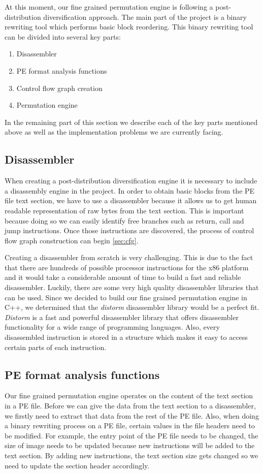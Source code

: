 \documentclass[11pt,final,conference,a4paper]{IEEEtran}
\begin{document}
At this moment, our fine grained permutation engine is following a post-distribution diversification approach. The main part of the project is a binary rewriting tool which performs basic block reordering. This binary rewriting tool can be divided into several key parts:
\begin{enumerate}
\item Disassembler
\item PE format analysis functions
\item Control flow graph creation
\item Permutation engine
\end{enumerate}
In the remaining part of this section we describe each of the key parts mentioned above as well as the implementation problems we are currently facing.

\subsection{Disassembler}
\label{sec:disassembler}
When creating a post-distribution diversification engine it is necessary to include a disassembly engine in the project. In order to obtain basic blocks from the PE file text section, we have to use a disassembler because it allows us to get human readable representation of raw bytes from the text section. This is important because doing so we can easily identify free branches such as return, call and jump instructions. Once those instructions are discovered, the process of control flow graph construction can begin \ref{sec:cfg}.

Creating a disassembler from scratch is very challenging. This is due to the fact that there are hundreds of possible processor instructions for the x86 platform and it would take a considerable amount of time to build a fast and reliable disassembler. Luckily, there are some very high quality disassembler libraries that can be used. Since we decided to build our fine grained permutation engine in C++, we determined that the \emph{distorm} disassembler library would be a perfect fit. \emph{Distorm} is a fast and powerful disassembler library that offers disassembler functionality for a wide range of programming languages. Also, every disassembled instruction is stored in a structure which makes it easy to access certain parts of each instruction.

\subsection{PE format analysis functions}
\label{sec:pe_functions}
Our fine grained permutation engine operates on the content of the text section in a PE file. Before we can give the data from the text section to a disassembler, we firstly need to extract that data from the rest of the PE file. Also, when doing a binary rewriting process on a PE file, certain values in the file headers need to be modified. For example, the entry point of the PE file needs to be changed, the size of image needs to be updated because new instructions will be added to the text section. By adding new instructions, the text section size gets changed so we need to update the section header accordingly.
\end{document}
